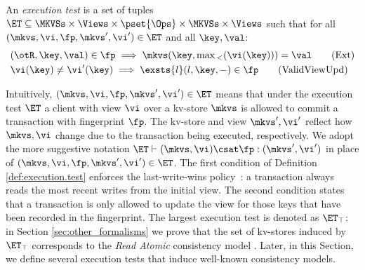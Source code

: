 
\begin{definition}
\label{def:execution.test}
An \emph{execution test} is a set of tuples $\ET \subseteq \MKVSs \times \Views \times \pset{\Ops} \times \MKVSs \times \Views$ 
such that for all $(\mkvs, \vi, \fp, \mkvs', \vi') \in \ET$ and all $\key, \val$:
%
{%
\begin{align}
\small
    & 
	(\otR, \key, \val) \in \fp \implies
	\mkvs(\key, \max{}_{<}(\vi(\key))) = \val  
	\tag{Ext} \label{eq:read-external} \\
    & 
    \vi(\key) \neq \vi'(\key) 
    \implies
    \exsts{l} (l, \key, -) \in \fp
    \tag{ValidViewUpd} \label{eq:valid-view-update}
\end{align}%
}%
\end{definition}
%
\noindent 
Intuitively, $(\mkvs, \vi, \fp, \mkvs', \vi') \in \ET$ means that under the execution test $\ET$ 
a client with view $\vi$ over a kv-store $\mkvs$ is allowed to commit a transaction with 
fingerprint $\fp$. The kv-store and view $\mkvs', \vi'$ reflect how $\mkvs, \vi$ change due 
to the transaction being executed, respectively. We adopt the more suggestive notation 
$\ET \vdash (\mkvs, \vi) \csat \fp: (\mkvs', \vi')$ in place of $(\mkvs, \vi, \fp, \mkvs', \vi') \in \ET$.
The first condition of Definition \ref{def:execution.test} enforces the last-write-wins policy~\cite{vogels:2009:ec:1435417.1435432}: 
a transaction always reads the most recent writes from the initial view.  
The second condition states that a transaction is only allowed to update the view for those keys 
that have been recorded in the fingerprint.  The largest execution test is denoted as $\ET_{\top}$: 
in Section \ref{sec:other_formalisms} we prove that the set of kv-stores induced by $\ET_{\top}$ 
corresponds to the \emph{Read Atomic} consistency model \cite{ramp}. Later, in this Section, 
we define several execution tests that induce well-known consistency models.

